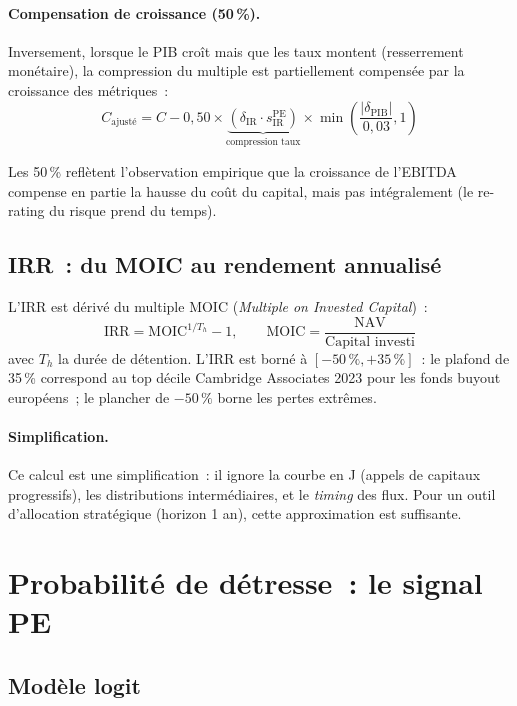 \documentclass[12pt, a4paper, twoside, openright]{report}
\theoremstyle{definition}
\begin{document}
\paragraph{Compensation de croissance (50\,\%).} Inversement, lorsque le PIB croît mais que les taux montent (resserrement monétaire), la compression du multiple est partiellement compensée par la croissance des métriques~:
$$C_{\text{ajusté}} = C - 0{,}50 \times \underbrace{(\delta_{\text{IR}} \cdot s^{\text{PE}}_{\text{IR}})}_{\text{compression taux}} \times \min\!\left(\frac{|\delta_{\text{PIB}}|}{0{,}03}, 1\right)$$

Les 50\,\% reflètent l'observation empirique que la croissance de l'EBITDA compense en partie la hausse du coût du capital, mais pas intégralement (le re-rating du risque prend du temps).

\subsection{IRR~: du MOIC au rendement annualisé}

L'IRR est dérivé du multiple MOIC (\emph{Multiple on Invested Capital})~:
\begin{equation}
\text{IRR} = \text{MOIC}^{1/T_h} - 1, \qquad \text{MOIC} = \frac{\text{NAV}}{\text{Capital investi}}
\label{eq:irr}
\end{equation}
avec $T_h$ la durée de détention. L'IRR est borné à $[-50\,\%, +35\,\%]$~: le plafond de 35\,\% correspond au top décile Cambridge Associates 2023 pour les fonds buyout européens~; le plancher de $-50\,\%$ borne les pertes extrêmes.

\paragraph{Simplification.} Ce calcul est une simplification~: il ignore la courbe en J (appels de capitaux progressifs), les distributions intermédiaires, et le \emph{timing} des flux. Pour un outil d'allocation stratégique (horizon 1 an), cette approximation est suffisante.

\section{Probabilité de détresse~: le signal PE}
\label{sec:pe:distress}

\subsection{Modèle logit}
\end{document}
